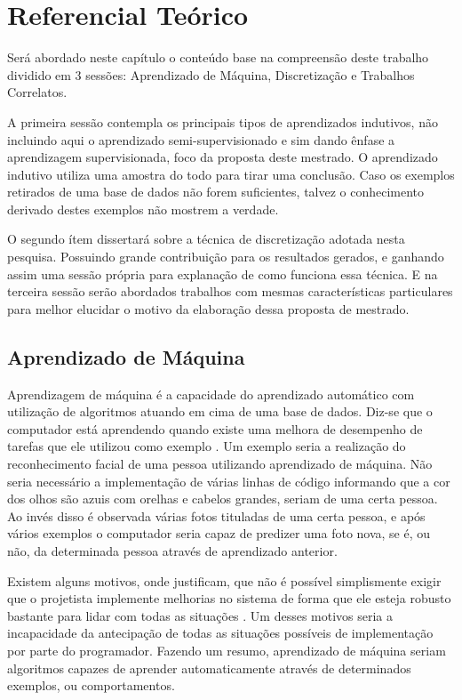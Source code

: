 \chapter{Referencial Teórico}\label{cap:refTeor}

Será abordado neste capítulo o conteúdo base na compreensão deste trabalho dividido em 3 sessões: Aprendizado de Máquina, Discretização e Trabalhos Correlatos. 

A primeira sessão contempla os principais tipos de aprendizados indutivos, não incluindo aqui o aprendizado semi-supervisionado e sim dando ênfase a aprendizagem supervisionada, foco da proposta deste mestrado. O aprendizado indutivo utiliza uma amostra do todo para tirar uma conclusão. Caso os exemplos retirados de uma base de dados não forem suficientes, talvez o conhecimento derivado destes exemplos não mostrem a verdade. 

O segundo ítem dissertará sobre a técnica de discretização adotada nesta pesquisa. Possuindo grande contribuição para os resultados gerados, e ganhando assim uma sessão própria para explanação de como funciona essa técnica. E na terceira sessão serão abordados trabalhos com mesmas características particulares para melhor elucidar o motivo da elaboração dessa proposta de mestrado.



\section{Aprendizado de Máquina}\label{sec:aprendMaq}

Aprendizagem de máquina é a capacidade do aprendizado automático com utilização de algoritmos atuando em cima de uma base de dados.  Diz-se que o computador está aprendendo quando existe uma melhora de desempenho de tarefas que ele utilizou como exemplo \cite{Mitchell1997}. Um exemplo seria a realização do reconhecimento facial de uma pessoa utilizando aprendizado de máquina. Não seria necessário a implementação de várias linhas de código informando que a cor dos olhos são azuis com orelhas e cabelos grandes, seriam de uma certa pessoa. Ao invés disso é observada várias fotos tituladas de uma certa pessoa, e após vários exemplos o computador seria capaz de predizer uma foto nova, se é, ou não, da determinada pessoa através de aprendizado anterior.

Existem alguns motivos, onde justificam, que não é possível simplismente exigir que o projetista implemente melhorias no sistema de forma que ele esteja robusto bastante para lidar com todas as situações \cite{RusselStuart.Norvig2013}. Um  desses motivos seria a incapacidade da antecipação de  todas as situações possíveis de implementação por parte do programador. Fazendo um resumo, aprendizado de máquina seriam algoritmos capazes de aprender automaticamente através de  determinados exemplos, ou comportamentos. 

